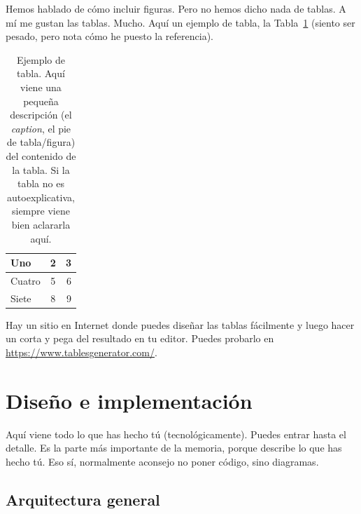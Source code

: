 \documentclass[a4paper, 12pt]{book}
\begin{document}
Hemos hablado de cómo incluir figuras.
Pero no hemos dicho nada de tablas.
A mí me gustan las tablas.
Mucho.
Aquí un ejemplo de tabla, la Tabla~\ref{tab:ejemplo} (siento ser pesado, pero nota cómo he puesto la referencia).

\begin{table}
 \begin{center}
  \begin{tabular}{ | l | c | r |} %
    \hline
    Uno & 2 & 3 \\ \hline %
    Cuatro & 5 & 6 \\ \hline
    Siete & 8 & 9 \\
    \hline
  \end{tabular}
  \caption{Ejemplo de tabla. Aquí viene una pequeña descripción (el \emph{caption}, el pie de tabla/figura) del contenido de la tabla. Si la tabla no es autoexplicativa, siempre viene bien aclararla aquí.}
  \label{tab:ejemplo}
 \end{center}
\end{table}

Hay un sitio en Internet donde puedes diseñar las tablas fácilmente y luego hacer un corta y pega del resultado en tu editor.
Puedes probarlo en \url{https://www.tablesgenerator.com/}.




\cleardoublepage
\chapter{Diseño e implementación}
\label{sec:diseno}

Aquí viene todo lo que has hecho tú (tecnológicamente). 
Puedes entrar hasta el detalle. 
Es la parte más importante de la memoria, porque describe lo que has hecho tú.
Eso sí, normalmente aconsejo no poner código, sino diagramas.



\section{Arquitectura general} 
\label{sec:arquitectura}
\end{document}
